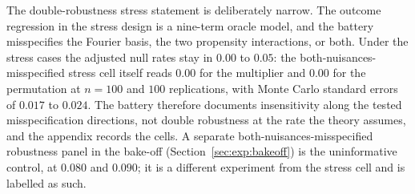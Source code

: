 The double-robustness stress statement is deliberately narrow. The outcome regression in the stress design is a nine-term oracle model, and the battery misspecifies the Fourier basis, the two propensity interactions, or both. Under the stress cases the adjusted null rates stay in $0.00$ to $0.05$: the both-nuisances-misspecified stress cell itself reads $0.00$ for the multiplier and $0.00$ for the permutation at $n=100$ and $100$ replications, with Monte Carlo standard errors of $0.017$ to $0.024$. The battery therefore documents insensitivity along the tested misspecification directions, not double robustness at the rate the theory assumes, and the appendix records the cells. A separate both-nuisances-misspecified robustness panel in the bake-off (Section~\ref{sec:exp:bakeoff}) is the uninformative control, at $0.080$ and $0.090$; it is a different experiment from the stress cell and is labelled as such.

